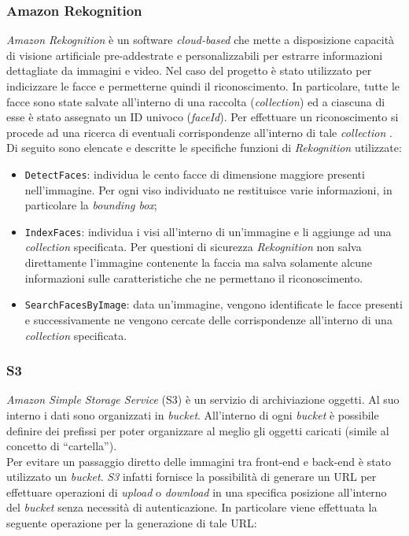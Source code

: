 	\subsubsection{Amazon Rekognition} \label{subsec:rekognition}
	
	\emph{Amazon Rekognition} è un software \emph{cloud-based} che mette a disposizione capacità di visione artificiale pre-addestrate e personalizzabili per estrarre informazioni dettagliate da immagini e video. Nel caso del progetto è stato utilizzato per indicizzare le facce e permetterne quindi il riconoscimento. In particolare, tutte le facce sono state salvate all'interno di una raccolta (\emph{collection}) ed a ciascuna di esse è stato assegnato un ID univoco (\emph{faceId}). Per effettuare un riconoscimento si procede ad una ricerca di eventuali corrispondenze all'interno di tale \emph{collection} . \\
	Di seguito sono elencate e descritte le specifiche funzioni di \emph{Rekognition} utilizzate:
	\begin{itemize}
		\item \texttt{DetectFaces}: individua le cento facce di dimensione maggiore presenti nell'immagine. Per ogni viso individuato ne restituisce varie informazioni, in particolare la \emph{bounding box};
		\item \texttt{IndexFaces}: individua i visi all'interno di un'immagine e li aggiunge ad una \emph{collection} specificata. Per questioni di sicurezza \emph{Rekognition} non salva direttamente l'immagine contenente la faccia ma salva solamente alcune informazioni sulle caratteristiche che ne permettano il riconoscimento.
		\item \texttt{SearchFacesByImage}: data un'immagine, vengono identificate le facce presenti e successivamente ne vengono cercate delle corrispondenze all'interno di una \emph{collection} specificata.
		
	\end{itemize} 
	
	\subsubsection{S3}
	\emph{Amazon Simple Storage Service} (S3) è un servizio di archiviazione oggetti. Al suo interno i dati sono organizzati in \emph{bucket}. All'interno di ogni \emph{bucket} è possibile definire dei prefissi per poter organizzare al meglio gli oggetti caricati (simile al concetto di ``cartella''). \\ 
	Per evitare un passaggio diretto delle immagini tra front-end e back-end è stato utilizzato un \emph{bucket}. \emph{S3} infatti fornisce la possibilità di generare un URL per effettuare operazioni di \emph{upload} o \emph{download} in una specifica posizione all'interno del \emph{bucket} senza necessità di autenticazione. In particolare viene effettuata la seguente operazione per la generazione di tale URL:


